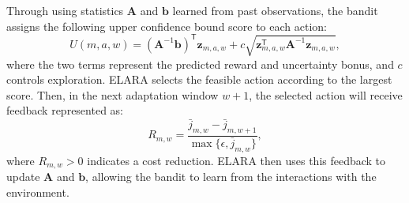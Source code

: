 \documentclass[10pt, conference, letterpaper]{IEEEtran}
\begin{document}
Through using statistics $\mathbf A$ and $\mathbf b$ learned from past observations, the bandit assigns the following upper confidence bound score to each action:
\begin{equation}
U(m,a,w)=(\mathbf A^{-1}\mathbf b)^{\mathsf T}\mathbf z_{m,a,w}
+c\sqrt{\mathbf z_{m,a,w}^{\mathsf T}\mathbf A^{-1}\mathbf z_{m,a,w}},
\label{eq:new_contextual_ucb}
\end{equation}
where the two terms represent the predicted reward and uncertainty bonus, and $c$ controls exploration. 
ELARA selects the feasible action according to the largest score.
Then, in the next adaptation window $w+1$, the selected action will receive feedback represented as:
\begin{equation}
R_{m,w}=\frac{\bar j_{m,w}-\bar j_{m,w+1}}
{\max\{\epsilon,\bar j_{m,w}\}},
\label{eq:new_deployment_reward}
\end{equation}
where $R_{m,w}>0$ indicates a cost reduction. 
ELARA then uses this feedback to update $\mathbf A$ and $\mathbf b$, allowing the bandit to learn from the interactions with the environment.
\end{document}

